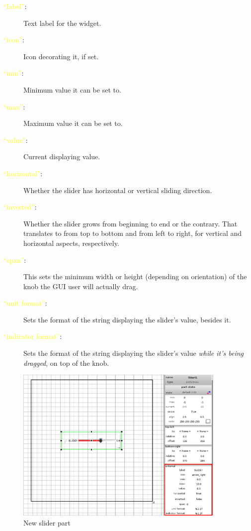 \documentclass[a4paper]{profusion}
\newcommand{\GUIEditable}[1]{\textcolor{yellow}{#1}} %
\begin{document}
\begin{description}
  \item[\GUIEditable{``label''}:] Text label for the widget.
  \item[\GUIEditable{``icon''}:] Icon decorating it, if set.
  \item[\GUIEditable{``min''}:] Minimum value it can be set to.
  \item[\GUIEditable{``max''}:] Maximum value it can be set to.
  \item[\GUIEditable{``value''}:] Current displaying value.
  \item[\GUIEditable{``horizontal''}:] Whether the slider has
    horizontal or vertical sliding direction.
  \item[\GUIEditable{``inverted''}:] Whether the slider grows from
    beginning to end or the contrary. That translates to from top to
    bottom and from left to right, for vertical and horizontal
    aspects, respectively.
  \item[\GUIEditable{``span''}:] This sets the minimum width or height
    (depending on orientation) of the knob the GUI user will actually
    drag.
  \item[\GUIEditable{``unit format''}:] Sets the format of the string
    displaying the slider's value, besides it.
  \item[\GUIEditable{``indicator format''}:] Sets the format of the
    string displaying the slider's value \emph{while it's being
      dragged}, on top of the knob.
\end{description}

\begin{figure}[h!]
  \centering
  \includegraphics[width=0.9\textwidth]{images/new_slider.png}
  \caption{New slider part}
  \label{fig:new_slider}
\end{figure}
\end{document}
